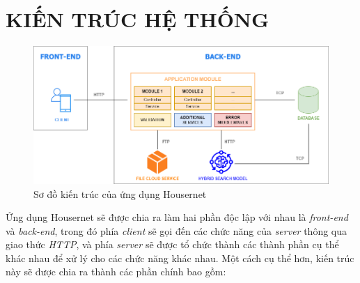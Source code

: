 \section{KIẾN TRÚC HỆ THỐNG}
\begin{figure}[h]
    \centering
    \includegraphics[width=1\textwidth]{Images/SystemArchitecture.png}
    \caption{Sơ đồ kiến trúc của ứng dụng Housernet}
\end{figure}
Ứng dụng Housernet sẽ được chia ra làm hai phần độc lập với nhau là \textit{front-end} và \textit{back-end}, trong đó phía \textit{client} sẽ gọi đến các chức năng của \textit{server} thông qua giao thức \textit{HTTP}, và phía \textit{server} sẽ được tổ chức thành các thành phần cụ thể khác nhau để xử lý cho các chức năng khác nhau. Một cách cụ thể hơn, kiến trúc này sẽ được chia ra thành các phần chính bao gồm:
